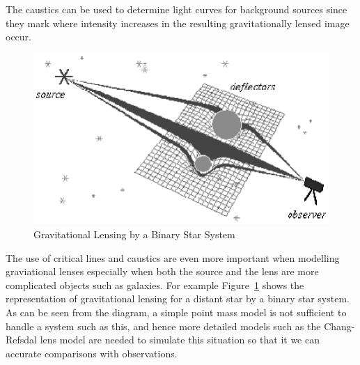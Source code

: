 \documentclass[aspectratio=1610,xcolor=dvipsnames,t]{beamer}
\begin{document}
    The caustics can be used to determine light curves for background
    sources since they mark where intensity increases in the resulting
    gravitationally lensed image occur.

    \begin{figure}
        \caption{Gravitational Lensing by a Binary Star System}
        \label{fig:binary-star} 
        \begin{center}
            \includegraphics[width=\columnwidth]{images/lens_model.eps}
        \end{center}
    \end{figure}

    The use of critical lines and caustics are even more important
    when modelling graviational lenses especially when both the source
    and the lens are more complicated objects such as galaxies.
    For example Figure~\ref{fig:binary-star} shows the representation of 
    gravitational lensing for a distant star by a binary star system.
    As can be seen from the diagram, a simple point mass model is
    not sufficient to handle a system such as this, and hence
    more detailed models such as the Chang-Refsdal lens model
    are needed to simulate this situation so that it we can accurate
    comparisons with observations.

\end{document}
